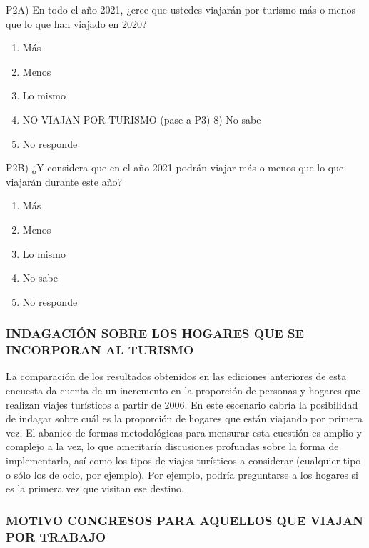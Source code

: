 \documentclass[
  openany]{book}
\providecommand{\tightlist}{%
  \setlength{\itemsep}{0pt}\setlength{\parskip}{0pt}}
\begin{document}
P2A) En todo el año 2021, ¿cree que ustedes viajarán por turismo más o menos que lo que han viajado en 2020?

\begin{enumerate}
\def\labelenumi{\arabic{enumi})}
\tightlist
\item
  Más
\item
  Menos
\item
  Lo mismo
\item
  NO VIAJAN POR TURISMO (pase a P3) 8) No sabe
\item
  No responde
\end{enumerate}

P2B) ¿Y considera que en el año 2021 podrán viajar más o menos que lo que viajarán durante este año?

\begin{enumerate}
\def\labelenumi{\arabic{enumi})}
\tightlist
\item
  Más
\item
  Menos
\item
  Lo mismo
\item
  No sabe
\item
  No responde
\end{enumerate}

\hypertarget{indagaciuxf3n-sobre-los-hogares-que-se-incorporan-al-turismo}{%
\subsubsection{\texorpdfstring{\textbf{INDAGACIÓN SOBRE LOS HOGARES QUE SE INCORPORAN AL TURISMO}}{INDAGACIÓN SOBRE LOS HOGARES QUE SE INCORPORAN AL TURISMO}}\label{indagaciuxf3n-sobre-los-hogares-que-se-incorporan-al-turismo}}

La comparación de los resultados obtenidos en las ediciones anteriores de esta encuesta da cuenta de un incremento en la proporción de personas y hogares que realizan viajes turísticos a partir de 2006.
En este escenario cabría la posibilidad de indagar sobre cuál es la proporción de hogares que están viajando por primera vez.
El abanico de formas metodológicas para mensurar esta cuestión es amplio y complejo a la vez, lo que ameritaría discusiones profundas sobre la forma de implementarlo, así como los tipos de viajes turísticos a considerar (cualquier tipo o sólo los de ocio, por ejemplo).
Por ejemplo, podría preguntarse a los hogares si es la primera vez que visitan ese destino.

\hypertarget{motivo-congresos-para-aquellos-que-viajan-por-trabajo}{%
\subsubsection{\texorpdfstring{\textbf{MOTIVO CONGRESOS PARA AQUELLOS QUE VIAJAN POR TRABAJO}}{MOTIVO CONGRESOS PARA AQUELLOS QUE VIAJAN POR TRABAJO}}\label{motivo-congresos-para-aquellos-que-viajan-por-trabajo}}
\end{document}
